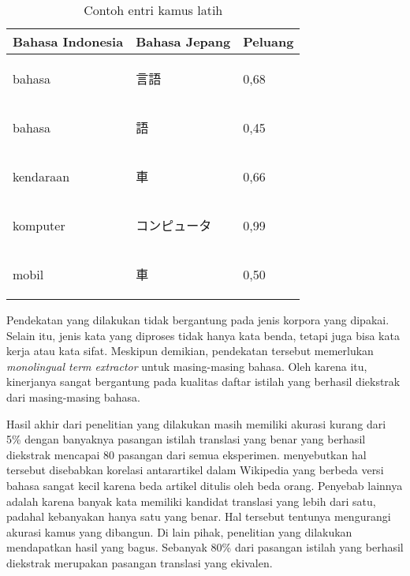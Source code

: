 \documentclass[../main/main.tex]{subfiles}
\begin{document}
\begin{table}[htbp]
	\centering
	\caption{Contoh entri kamus latih}
	\label{tbl:contoh_entri_kamus}
	\begin{tabular}{|l|l|l|}
		\hline
		\textbf{Bahasa Indonesia} & \textbf{Bahasa Jepang} & \textbf{Peluang}\\ \hline
		bahasa & \begin{CJK}{UTF8}{min}言語\end{CJK} & 0,68\\ \hline
		bahasa & \begin{CJK}{UTF8}{min}語\end{CJK} & 0,45\\ \hline
		kendaraan & \begin{CJK}{UTF8}{min}車\end{CJK} & 0,66\\ \hline
		komputer & \begin{CJK}{UTF8}{min}コンピュータ\end{CJK} & 0,99\\ \hline
		mobil & \begin{CJK}{UTF8}{min}車\end{CJK} & 0,50\\ \hline
	\end{tabular}
\end{table}

Pendekatan yang dilakukan \textcite{aker} tidak bergantung pada jenis korpora yang dipakai. Selain itu, jenis kata yang diproses tidak hanya kata benda, tetapi juga bisa kata kerja atau kata sifat. Meskipun demikian, pendekatan tersebut memerlukan \textit{monolingual term extractor} untuk masing-masing bahasa. Oleh karena itu, kinerjanya sangat bergantung pada kualitas daftar istilah yang berhasil diekstrak dari masing-masing bahasa.

Hasil akhir dari penelitian yang dilakukan \textcite{limanthie} masih memiliki akurasi kurang dari 5\% dengan banyaknya pasangan istilah translasi yang benar yang berhasil diekstrak mencapai 80 pasangan dari semua eksperimen. \textcite{limanthie} menyebutkan hal tersebut disebabkan korelasi antarartikel dalam Wikipedia yang berbeda versi bahasa sangat kecil karena beda artikel ditulis oleh beda orang. Penyebab lainnya adalah karena banyak kata memiliki kandidat translasi yang lebih dari satu, padahal kebanyakan hanya satu yang benar. Hal tersebut tentunya mengurangi akurasi kamus yang dibangun. Di lain pihak, penelitian yang dilakukan \textcite{aker} mendapatkan hasil yang bagus. Sebanyak 80\% dari pasangan istilah yang berhasil diekstrak merupakan pasangan translasi yang ekivalen.
\end{document}
